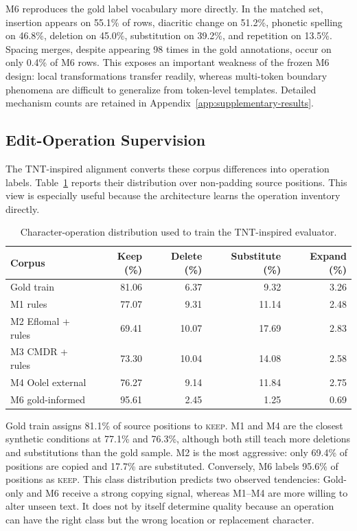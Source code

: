\documentclass[12pt, a4paper, twoside, openany]{report}
\begin{document}
M6 reproduces the gold label vocabulary more directly. In the matched set, insertion appears on 55.1\% of rows, diacritic change on 51.2\%, phonetic spelling on 46.8\%, deletion on 45.0\%, substitution on 39.2\%, and repetition on 13.5\%. Spacing merges, despite appearing 98 times in the gold annotations, occur on only 0.4\% of M6 rows. This exposes an important weakness of the frozen M6 design: local transformations transfer readily, whereas multi-token boundary phenomena are difficult to generalize from token-level templates. Detailed mechanism counts are retained in Appendix~\ref{app:supplementary-results}.

\subsection{Edit-Operation Supervision}

The TNT-inspired alignment converts these corpus differences into operation labels. Table~\ref{tab:operation-distribution} reports their distribution over non-padding source positions. This view is especially useful because the architecture learns the operation inventory directly.

\begin{table}[H]
	\centering
	\caption{Character-operation distribution used to train the TNT-inspired evaluator.}
	\label{tab:operation-distribution}
	\small
	\begin{tabular}{lrrrr}
		\toprule
		\textbf{Corpus} & \textbf{Keep (\%)} & \textbf{Delete (\%)} & \textbf{Substitute (\%)} & \textbf{Expand (\%)} \\
		\midrule
		Gold train & 81.06 & 6.37 & 9.32 & 3.26 \\
		M1 rules & 77.07 & 9.31 & 11.14 & 2.48 \\
		M2 Eflomal + rules & 69.41 & 10.07 & 17.69 & 2.83 \\
		M3 CMDR + rules & 73.30 & 10.04 & 14.08 & 2.58 \\
		M4 Oolel external & 76.27 & 9.14 & 11.84 & 2.75 \\
		M6 gold-informed & 95.61 & 2.45 & 1.25 & 0.69 \\
		\bottomrule
	\end{tabular}
\end{table}

Gold train assigns 81.1\% of source positions to \textsc{keep}. M1 and M4 are the closest synthetic conditions at 77.1\% and 76.3\%, although both still teach more deletions and substitutions than the gold sample. M2 is the most aggressive: only 69.4\% of positions are copied and 17.7\% are substituted. Conversely, M6 labels 95.6\% of positions as \textsc{keep}. This class distribution predicts two observed tendencies: Gold-only and M6 receive a strong copying signal, whereas M1--M4 are more willing to alter unseen text. It does not by itself determine quality because an operation can have the right class but the wrong location or replacement character.
\end{document}
